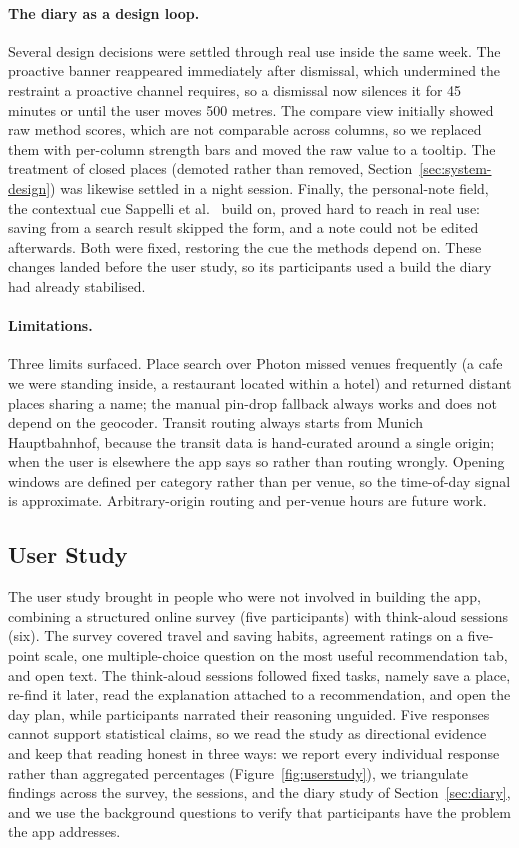 \documentclass[acmlarge]{acmart}
\begin{document}
\paragraph{The diary as a design loop.}
Several design decisions were settled through real use inside the same
week. The proactive banner reappeared immediately after dismissal, which
undermined the restraint a proactive channel requires, so a dismissal now
silences it for 45 minutes or until the user moves 500 metres. The compare
view initially showed raw method scores, which are not comparable across
columns, so we replaced them with per-column strength bars and moved the
raw value to a tooltip. The treatment of closed places (demoted rather
than removed, Section~\ref{sec:system-design}) was likewise settled in a
night session. Finally, the personal-note field, the contextual cue
Sappelli et al.~\cite{sappelli2017} build on, proved hard to reach in real
use: saving from a search result skipped the form, and a note could not be
edited afterwards. Both were fixed, restoring the cue the methods depend
on. These changes landed before the user study, so its participants used a
build the diary had already stabilised.

\paragraph{Limitations.}
Three limits surfaced. Place search over Photon missed venues frequently
(a cafe we were standing inside, a restaurant located within a hotel) and
returned distant places sharing a name; the manual pin-drop fallback
always works and does not depend on the geocoder. Transit routing always
starts from Munich Hauptbahnhof, because the transit data is hand-curated
around a single origin; when the user is elsewhere the app says so rather
than routing wrongly. Opening windows are defined per category rather than
per venue, so the time-of-day signal is approximate. Arbitrary-origin
routing and per-venue hours are future work.

\subsection{User Study}
\label{sec:userstudy}

The user study brought in people who were not involved in building the
app, combining a structured online survey (five participants) with
think-aloud sessions (six). The survey covered travel and saving habits,
agreement ratings on a five-point scale, one multiple-choice question on
the most useful recommendation tab, and open text. The think-aloud
sessions followed fixed tasks, namely save a place, re-find it later, read
the explanation attached to a recommendation, and open the day plan, while
participants narrated their reasoning unguided. Five responses cannot
support statistical claims, so we read the study as directional evidence
and keep that reading honest in three ways: we report every individual
response rather than aggregated percentages
(Figure~\ref{fig:userstudy}), we triangulate findings across the survey,
the sessions, and the diary study of Section~\ref{sec:diary}, and we use
the background questions to verify that participants have the problem the
app addresses.
\end{document}
